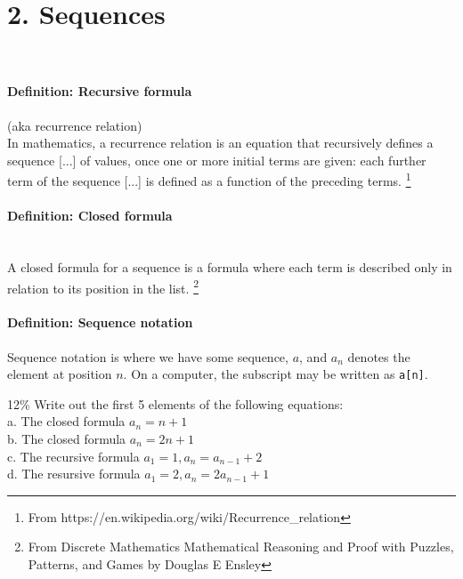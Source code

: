 \documentclass[a4paper,12pt]{book}
\begin{document}
    \section*{2. Sequences}
        \begin{intro}{\ }
            \paragraph{Definition: Recursive formula} (aka recurrence relation) \\
            In mathematics, a recurrence relation is an equation that recursively defines
            a sequence [...] of values, once one or more initial terms are given:
            each further term of the sequence [...] is defined as a function
            of the preceding terms.
            \footnote{From https://en.wikipedia.org/wiki/Recurrence\_relation}

            \paragraph{Definition: Closed formula} ~\\
            A closed formula for a sequence is a formula where each term is described
            only in relation to its position in the list.
            \footnote{From Discrete Mathematics Mathematical Reasoning and Proof with Puzzles, Patterns, and Games by Douglas E Ensley}

            \paragraph{Definition: Sequence notation}
            Sequence notation is where we have some sequence, $a$,
            and $a_{n}$ denotes the element at position $n$. On a computer,
            the subscript may be written as \texttt{a[n]}.
        \end{intro}

        

        \begin{question}{2}{12\%}
            Write out the first 5 elements of the following equations: \\
            \tab a. The closed formula $a_{n} = n+1$ \\
            \tab b. The closed formula $a_{n} = 2n+1$ \\
            \tab c. The recursive formula $a_{1} = 1, a_{n} = a_{n-1} + 2$ \\
            \tab d. The resursive formula $a_{1} = 2, a_{n} = 2 a_{n-1} + 1$
        \end{question}
\end{document}
